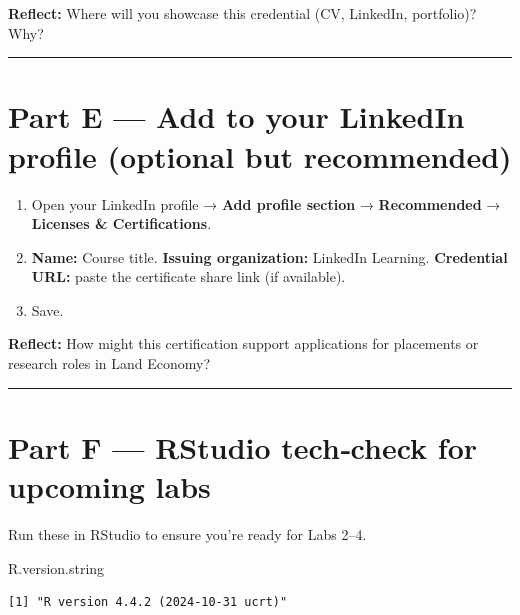 \documentclass[
  letterpaper,
  DIV=11,
  numbers=noendperiod]{scrreprt}
\newenvironment{Shaded}{\begin{snugshade}}{\end{snugshade}}
\newcommand{\NormalTok}[1]{\textcolor[rgb]{0.00,0.23,0.31}{#1}}
\providecommand{\tightlist}{%
  \setlength{\itemsep}{0pt}\setlength{\parskip}{0pt}}
\begin{document}
\textbf{Reflect:} Where will you showcase this credential (CV, LinkedIn,
portfolio)? Why?

\begin{center}\rule{0.5\linewidth}{0.5pt}\end{center}

\section{Part E --- Add to your LinkedIn profile (optional but
recommended)}\label{part-e-add-to-your-linkedin-profile-optional-but-recommended}

\begin{enumerate}
\def\labelenumi{\arabic{enumi}.}
\tightlist
\item
  Open your LinkedIn profile → \textbf{Add profile section} →
  \textbf{Recommended} → \textbf{Licenses \& Certifications}.\\
\item
  \textbf{Name:} Course title. \textbf{Issuing organization:} LinkedIn
  Learning. \textbf{Credential URL:} paste the certificate share link
  (if available).\\
\item
  Save.
\end{enumerate}

\textbf{Reflect:} How might this certification support applications for
placements or research roles in Land Economy?

\begin{center}\rule{0.5\linewidth}{0.5pt}\end{center}

\section{Part F --- RStudio tech‑check for upcoming
labs}\label{part-f-rstudio-techcheck-for-upcoming-labs}

Run these in RStudio to ensure you're ready for Labs 2--4.

\begin{Shaded}
\begin{Highlighting}[]
\NormalTok{R.version.string}
\end{Highlighting}
\end{Shaded}

\begin{verbatim}
[1] "R version 4.4.2 (2024-10-31 ucrt)"
\end{verbatim}
\end{document}
